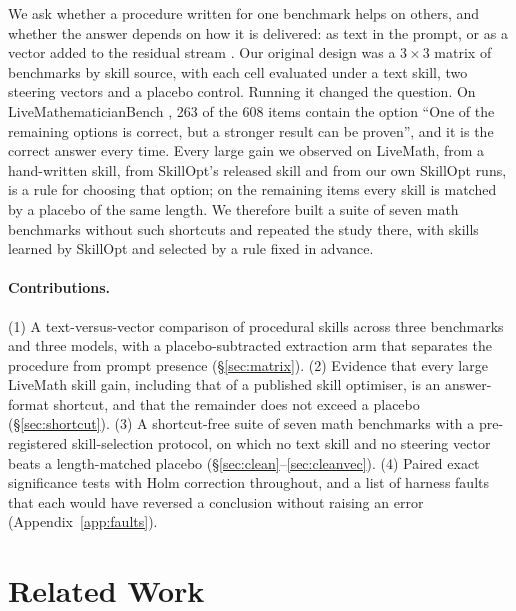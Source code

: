 \documentclass[11pt]{article}
\begin{document}
We ask whether a procedure written for one benchmark helps on others, and whether the answer depends
on how it is delivered: as text in the prompt, or as a vector added to the residual stream
\citep{panickssery2024caa}. Our original design was a $3\times3$ matrix of benchmarks by skill
source, with each cell evaluated under a text skill, two steering vectors and a placebo control.
Running it changed the question. On LiveMathematicianBench \citep{he2026livemath}, 263 of the 608
items contain the option ``One of the remaining options is correct, but a stronger result can be
proven'', and it is the correct answer every time. Every large gain we observed on LiveMath, from a
hand-written skill, from SkillOpt's released skill and from our own SkillOpt runs, is a rule for
choosing that option; on the remaining items every skill is matched by a placebo of the same length.
We therefore built a suite of seven math benchmarks without such shortcuts and repeated the study
there, with skills learned by SkillOpt and selected by a rule fixed in advance.

\paragraph{Contributions.}
(1) A text-versus-vector comparison of procedural skills across three benchmarks and three models,
with a placebo-subtracted extraction arm that separates the procedure from prompt presence
(\S\ref{sec:matrix}).
(2) Evidence that every large LiveMath skill gain, including that of a published skill optimiser,
is an answer-format shortcut, and that the remainder does not exceed a placebo
(\S\ref{sec:shortcut}).
(3) A shortcut-free suite of seven math benchmarks with a pre-registered skill-selection protocol,
on which no text skill and no steering vector beats a length-matched placebo
(\S\ref{sec:clean}--\ref{sec:cleanvec}).
(4) Paired exact significance tests with Holm correction throughout, and a list of harness faults
that each would have reversed a conclusion without raising an error (Appendix~\ref{app:faults}).

\section{Related Work}
\end{document}
